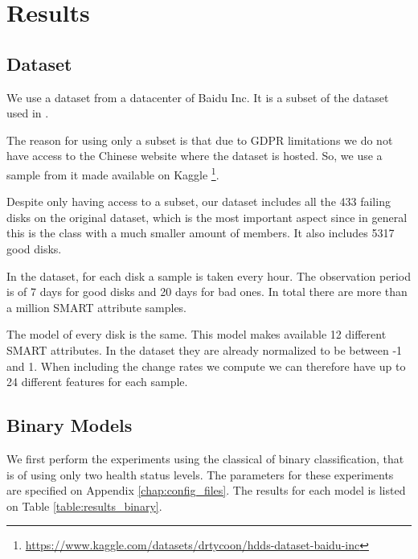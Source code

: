 \chapter{Results}\label{chap:results}

\section{Dataset}

We use a dataset from a datacenter of Baidu Inc.
It is a subset of the dataset used in \cite{Zhu13}.

The reason for using only a subset is that due to GDPR limitations we do not have access to the Chinese website where the dataset is hosted.
So, we use a sample from it made available on Kaggle \footnote{\url{https://www.kaggle.com/datasets/drtycoon/hdds-dataset-baidu-inc}}.

Despite only having access to a subset, our dataset includes all the 433 failing disks on the original dataset, which is the most important aspect since in general this is the class with a much smaller amount of members.
It also includes 5317 good disks.

In the dataset, for each disk a sample is taken every hour.
The observation period is of 7 days for good disks and 20 days for bad ones.
In total there are more than a million SMART attribute samples.

The model of every disk is the same.
This model makes available 12 different SMART attributes.
In the dataset they are already normalized to be between -1 and 1.
When including the change rates we compute we can therefore have up to 24 different features for each sample.

\section{Binary Models}

We first perform the experiments using the classical of binary classification, that is of using only two health status levels.
The parameters for these experiments are specified on Appendix \ref{chap:config_files}.
The results for each model is listed on Table \ref{table:results_binary}.

